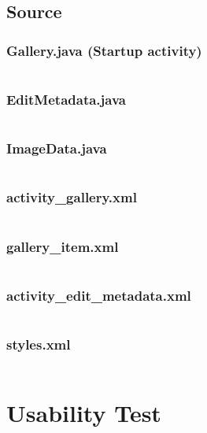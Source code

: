 \documentclass[11pt,english,numbers=endperiod,parskip=half]{scrartcl}
\begin{document}
\begin{landscape}
\subsection{Source}
\subsubsection{Gallery.java (Startup activity)}
\inputminted{java}{../../Apps/Metadata/app/src/main/java/au/net/danielparker/metadata/Gallery.java}

\subsubsection{EditMetadata.java}
\inputminted{java}{../../Apps/Metadata/app/src/main/java/au/net/danielparker/metadata/EditMetadata.java}

\subsubsection{ImageData.java}
\inputminted{java}{../../Apps/Metadata/app/src/main/java/au/net/danielparker/metadata/ImageData.java}

\subsubsection{activity\_gallery.xml}
\inputminted{xml}{../../Apps/Metadata/app/src/main/res/layout/activity_gallery.xml}

\subsubsection{gallery\_item.xml}
\inputminted{xml}{../../Apps/Metadata/app/src/main/res/layout/gallery_item.xml}

\subsubsection{activity\_edit\_metadata.xml}
\inputminted{xml}{../../Apps/Metadata/app/src/main/res/layout/activity_edit_metadata.xml}

\subsubsection{styles.xml}
\inputminted{xml}{../../Apps/Metadata/app/src/main/res/values/styles.xml}
\end{landscape}

\section{Usability Test}
\end{document}
